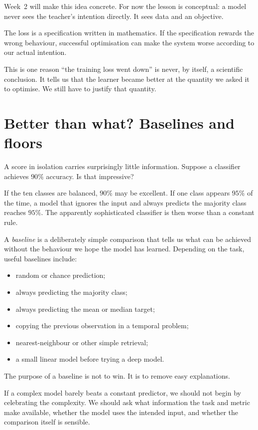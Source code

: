 Week~2 will make this idea concrete. For now the lesson is conceptual: a model never sees the teacher's intention directly. It sees data and an objective.

\begin{keyidea}
The loss is a specification written in mathematics. If the specification rewards the wrong behaviour, successful optimisation can make the system worse according to our actual intention.
\end{keyidea}

This is one reason ``the training loss went down'' is never, by itself, a scientific conclusion. It tells us that the learner became better at the quantity we asked it to optimise. We still have to justify that quantity.

\section{Better than what? Baselines and floors}

A score in isolation carries surprisingly little information. Suppose a classifier achieves \(90\%\) accuracy. Is that impressive?

If the ten classes are balanced, \(90\%\) may be excellent. If one class appears \(95\%\) of the time, a model that ignores the input and always predicts the majority class reaches \(95\%\). The apparently sophisticated classifier is then worse than a constant rule.

A \emph{baseline} is a deliberately simple comparison that tells us what can be achieved without the behaviour we hope the model has learned. Depending on the task, useful baselines include:

\begin{itemize}[leftmargin=*]
  \item random or chance prediction;
  \item always predicting the majority class;
  \item always predicting the mean or median target;
  \item copying the previous observation in a temporal problem;
  \item nearest-neighbour or other simple retrieval;
  \item a small linear model before trying a deep model.
\end{itemize}

The purpose of a baseline is not to win. It is to remove easy explanations.

If a complex model barely beats a constant predictor, we should not begin by celebrating the complexity. We should ask what information the task and metric make available, whether the model uses the intended input, and whether the comparison itself is sensible.

